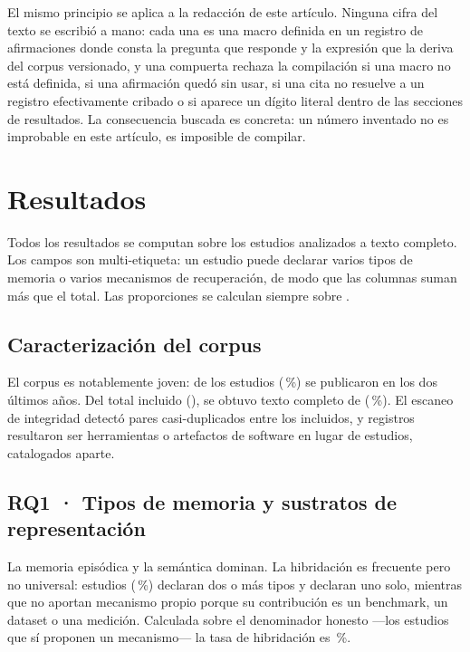 \documentclass[conference]{IEEEtran}
\begin{document}
El mismo principio se aplica a la redacción de este artículo. Ninguna cifra del texto se escribió a
mano: cada una es una macro definida en un registro de afirmaciones donde consta la pregunta que
responde y la expresión que la deriva del corpus versionado, y una compuerta rechaza la compilación
si una macro no está definida, si una afirmación quedó sin usar, si una cita no resuelve a un
registro efectivamente cribado o si aparece un dígito literal dentro de las secciones de resultados.
La consecuencia buscada es concreta: un número inventado no es improbable en este artículo, es
imposible de compilar.

\section{Resultados}
\label{sec:results}

Todos los resultados se computan sobre los \clCarAnalizados{} estudios analizados a texto completo.
Los campos son multi-etiqueta: un estudio puede declarar varios tipos de memoria o varios mecanismos
de recuperación, de modo que las columnas suman más que el total. Las proporciones se calculan
siempre sobre \clCarAnalizados{}.

\subsection{Caracterización del corpus}
\label{sec:res-corpus}

El corpus es notablemente joven: \clCarRecientes{} de los \clCarAnalizados{} estudios
(\clCarRecientesPct{}\,\%) se publicaron en los dos últimos años. Del total incluido
(\clSelIncluidosTotal{}), se obtuvo texto completo de \clSelConTexto{} (\clSelCobertura{}\,\%). El
escaneo de integridad detectó \clCalDuplicados{} pares casi-duplicados entre los incluidos, y
\clCalArtefactos{} registros resultaron ser herramientas o artefactos de software en lugar de
estudios, catalogados aparte.

\subsection{RQ1 · Tipos de memoria y sustratos de representación}
\label{sec:rq1}

La memoria episódica y la semántica dominan. La hibridación es frecuente pero no universal:
\clRQunoHibridosTipos{} estudios (\clRQunoHibridosPct{}\,\%) declaran dos o más tipos y
\clRQunoTipoUnico{} declaran uno solo, mientras que \clRQunoSinMecanismo{} no aportan mecanismo
propio porque su contribución es un benchmark, un dataset o una medición. Calculada sobre el
denominador honesto —los \clRQunoConMecanismo{} estudios que sí proponen un mecanismo— la tasa de
hibridación es \clRQunoHibridosSobreMec{}\,\%.
\end{document}
